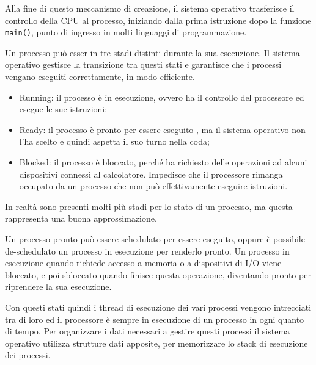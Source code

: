 \documentclass{article}
\numberwithin{equation}{subsection}
\begin{document}
Alla fine di questo meccanismo di creazione, il sistema operativo trasferisce il controllo della CPU al processo, iniziando dalla prima istruzione dopo la funzione 
\verb|main()|, punto di ingresso in molti linguaggi di programmazione. 


Un processo può esser in tre stadi distinti durante la sua esecuzione. Il sistema operativo gestisce la transizione tra questi stati e garantisce che i processi 
vengano eseguiti correttamente, in modo efficiente. 
\begin{itemize}
	\item Running: il processo è in esecuzione, ovvero ha il controllo del processore ed esegue le sue istruzioni;
	\item Ready: il processo è pronto per essere eseguito , ma il sistema operativo non l'ha scelto e quindi aspetta il suo turno nella coda;
	\item Blocked: il processo è bloccato, perché ha richiesto delle operazioni ad alcuni dispositivi connessi al calcolatore. Impedisce che il processore rimanga occupato da un processo che non può effettivamente eseguire istruzioni.  	
\end{itemize}

In realtà sono presenti molti più stadi per lo stato di un processo, ma questa rappresenta una buona approssimazione. 

Un processo pronto può essere schedulato per essere eseguito, oppure è possibile de-schedulato un processo in esecuzione per renderlo pronto. Un processo in esecuzione 
quando richiede accesso a memoria o a dispositivi di I/O viene bloccato, e poi sbloccato quando finisce questa operazione, diventando pronto per riprendere la sua 
esecuzione. 


Con questi stati quindi i thread di esecuzione dei vari processi vengono intrecciati tra di loro ed il processore è sempre in esecuzione di un processo in ogni 
quanto di tempo. 
Per organizzare i dati necessari a gestire questi processi il sistema operativo utilizza strutture dati apposite, per memorizzare lo stack di esecuzione dei processi. 
\end{document}
